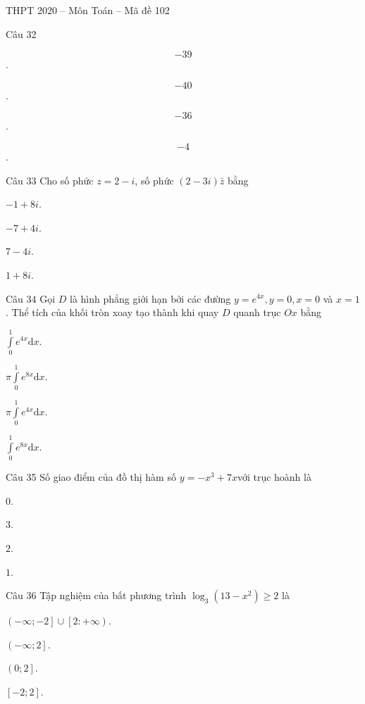\documentclass{book}
\begin{document}
\begin{quiz}{THPT 2020 – Môn Toán – Mã đề 102}
\begin{multi}[points=1]{Câu 32}
\item  \[-39\].	
\item*  \[-40\].	
\item  \[-36\].	
\item  \[-4\].
\end{multi}

\begin{multi}[points=1]{Câu 33}
 Cho số phức $z=2-i$, số phức $\left( 2-3i \right)\bar{z}$ bằng

\item  $-1+8i$.	
\item  $-7+4i$.	
\item*  $7-4i$.	
\item  $1+8i$.
\end{multi}

\begin{multi}[points=1]{Câu 34}
 Gọi $D$ là hình phẳng giới hạn bởi các đường $y={{e}^{4x}},y=0,x=0$ và $x=1$. Thể tích của khối tròn xoay tạo thành khi quay $D$ quanh trục $Ox$ bằng

\item  $\int\limits_{0}^{1}{{{e}^{4x}}\text{d}x}$.	
\item*  $\pi \int\limits_{0}^{1}{{{e}^{8x}}\text{d}x}$.	
\item  $\pi \int\limits_{0}^{1}{{{e}^{4x}}\text{d}x}$.	
\item  $\int\limits_{0}^{1}{{{e}^{8x}}\text{d}x}$.
\end{multi}

\begin{multi}[points=1]{Câu 35}
 Số giao điểm của đồ thị hàm số $y=-{{x}^{3}}+7x$với trục hoành là

\item  $0$.	
\item*  $3$.	
\item  $2$.	
\item  $1$.
\end{multi}

\begin{multi}[points=1]{Câu 36}
 Tập nghiệm của bất phương trình ${{\log }_{3}}\left( 13-{{x}^{2}} \right)\ge 2$ là

\item  $\left( -\infty ;-2 \right]\cup \left[ 2:+\infty  \right)$.	
\item  $\left( -\infty ;2 \right]$.	
\item  $\left( 0;2 \right]$.	
\item*  $\left[ -2;2 \right]$.
\end{multi}


\end{quiz}
\end{document}
